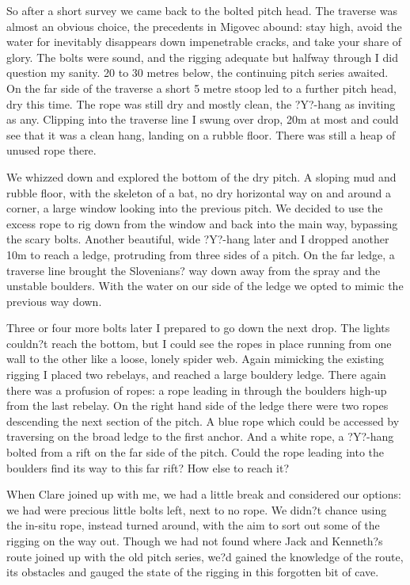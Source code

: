 \documentclass[onecolumn]{book}
\begin{document}
So after a short survey we came back to the bolted pitch head. The traverse was almost an obvious choice, the precedents in Migovec abound: stay high, avoid the water for inevitably disappears down impenetrable cracks, and take your share of glory. The bolts were sound, and the rigging adequate but halfway through I did question my sanity. 20 to 30 metres below, the continuing pitch series awaited. On the far side of the traverse a short 5 metre stoop led to a further pitch head, dry this time. The rope was still dry and mostly clean, the ?Y?-hang as inviting as any. Clipping into the traverse line I swung over drop, 20m at most and could see that it was a clean hang, landing on a rubble floor. There was still a heap of unused rope there. 

We whizzed down and explored the bottom of the dry pitch. A sloping mud and rubble floor, with the skeleton of a bat, no dry horizontal way on and around a corner, a large window looking into the previous pitch. We decided to use the excess rope to rig down from the window and back into the main way, bypassing the scary bolts. Another beautiful, wide ?Y?-hang later and I dropped another 10m to reach a ledge, protruding from three sides of a pitch. On the far ledge, a traverse line brought the Slovenians? way down away from the spray and the unstable boulders. With the water on our side of the ledge we opted to mimic the previous way down. 

Three or four more bolts later I prepared to go down the next drop. The lights couldn?t reach the bottom, but I could see the ropes in place running from one wall to the other like a loose, lonely spider web. Again mimicking the existing rigging I placed two rebelays, and reached a large bouldery ledge. There again there was a profusion of ropes: a rope leading in through the boulders high-up from the last rebelay. On the right hand side of the ledge there were two ropes descending the next section of the pitch. A blue rope which could be accessed by traversing on the broad ledge to the first anchor. And a white rope, a ?Y?-hang bolted from a rift on the far side of the pitch. Could the rope leading into the boulders find its way to this far rift?  How else to reach it?

When Clare joined up with me, we had a little break and considered our options: we had were precious little bolts left, next to no rope. We didn?t chance using the in-situ rope, instead turned around, with the aim to sort out some of the rigging on the way out. Though we had not found where Jack and Kenneth?s route joined up with the old pitch series, we?d gained the knowledge of the route, its obstacles and gauged the state of the rigging in this forgotten bit of cave. 
\end{document}
